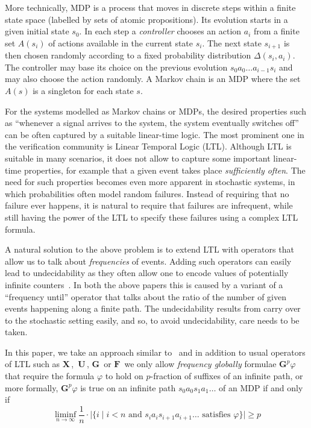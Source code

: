\documentclass[a4paper,UKenglish]{lipics}
\newcommand{\actions}{A}
\newcommand{\tra}{\Delta}
\newcommand{\Gf}[1]{\mathbf{G}^{#1}}
\newcommand{\X}{\mathbf{X}\,}
\newcommand{\G}{\mathbf{G}\,}
\newcommand{\U}{\,\mathbf{U}\,}
\newcommand{\F}{\mathbf{F}\,}
\begin{document}
More technically, MDP is a process that moves in discrete steps within a finite state space (labelled by sets of atomic propositions). Its evolution starts in a given initial state $s_0$. In each step a \emph{controller} chooses an action $a_i$ from a finite set $\actions(s_i)$ of actions available in the current state $s_i$. The next state $s_{i+1}$ is then chosen randomly according to a fixed probability distribution $\tra(s_i,a_i)$. The controller may base its choice on the previous evolution $s_0 a_0 \ldots a_{i-1} s_i$ and may also choose the action randomly. A Markov chain is an MDP where the set $\actions(s)$ is a singleton for each state $s$.

For the systems modelled as Markov chains or MDPs, the desired properties such as ``whenever a signal arrives to the system, the system eventually switches off'' can be often captured by
a suitable linear-time logic. The most prominent one in the verification community is Linear Temporal Logic (LTL).
Although LTL is suitable in many scenarios, it does not allow to capture some important linear-time properties,
for example that a given event takes place {\em sufficiently often}.
The need for such properties becomes even more apparent in stochastic systems, in which probabilities often model random failures.
Instead of requiring that no failure ever happens, it is natural to require that failures are infrequent, while still having the power of the LTL to specify these failures using a complex LTL formula.

A natural solution to the above problem is to extend LTL with operators that allow us to talk about {\em frequencies} of events.
Adding such operators can easily lead to undecidability as they often allow one to encode
values of potentially infinite counters~\cite{BDL-tase12,BMM14}. In both the above papers this is caused by a variant of a ``frequency until'' operator
that talks about the ratio of the number of given events happening along a finite path. The undecidability results from \cite{BDL-tase12,BMM14} carry over to the stochastic setting easily, and so, to avoid undecidability, care needs to be taken.

In this paper, we take an approach similar to~\cite{AT12} and in addition to usual operators of LTL such as $\X$, $\U$, $\G$ or $\F$ we only allow {\em frequency globally} formulae $\Gf{p} \varphi$ that require the formula $\varphi$ to hold on $p$-fraction of suffixes of an infinite path,
or more formally, $\Gf{p} \varphi$ is true on an infinite path $s_0a_0s_1 a_1 \ldots$ of an MDP if and only if
$$\liminf_{n\to\infty} \frac{1}{n}\cdot \Big|\{i \mid \text{$i < n$ and $s_i a_i s_{i+1} a_{i+1} \ldots$ satisfies $\varphi$}\}\Big| \ge p$$
\end{document}
